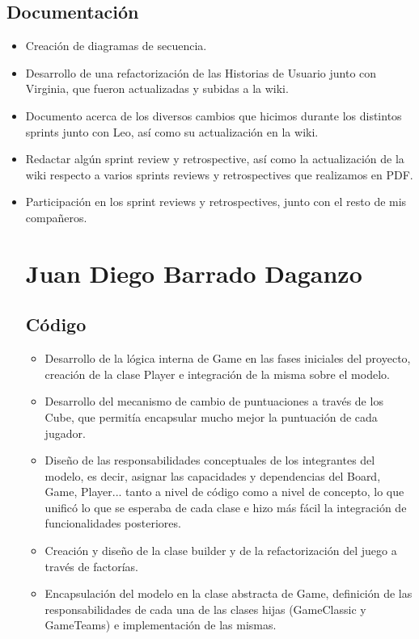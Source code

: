 \documentclass[../FINAL/Scrum/SCRUM.tex]{subfiles}
\begin{document}
\subsection*{Documentación}
\begin{itemize}
\item Creación de diagramas de secuencia.
\item Desarrollo de una refactorización de las Historias de Usuario junto con Virginia, que fueron actualizadas y subidas a la wiki.
\item Documento acerca de los diversos cambios que hicimos durante los distintos sprints junto con Leo, así como su actualización en la wiki.
\item Redactar algún sprint review y retrospective, así como la actualización de la wiki respecto a varios sprints reviews y retrospectives que realizamos en PDF.
\item Participación en los sprint reviews y retrospectives, junto con el resto de mis compañeros.

\section{Juan Diego Barrado Daganzo}
\subsection*{Código}
\begin{itemize}

\item Desarrollo de la lógica interna de Game en las fases iniciales del proyecto, creación de la clase Player e integración de la misma sobre el modelo.

\item Desarrollo del mecanismo de cambio de puntuaciones a través de los Cube, que permitía encapsular mucho mejor la puntuación de cada jugador.

\item Diseño de las responsabilidades conceptuales de los integrantes del modelo, es decir, asignar las capacidades y dependencias del Board, Game, Player... tanto a nivel de código como a nivel de concepto, lo que unificó lo que se esperaba de cada clase e hizo más fácil la integración de funcionalidades posteriores.

\item Creación y diseño de la clase builder y de la refactorización del juego a través de factorías.

\item Encapsulación del modelo en la clase abstracta de Game, definición de las responsabilidades de cada una de las clases hijas (GameClassic y GameTeams) e implementación de las mismas.


\end{itemize}
\end{itemize}
\end{document}
